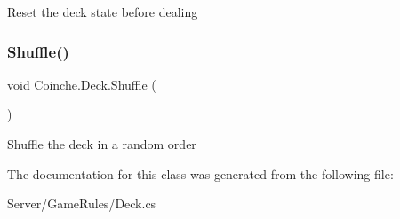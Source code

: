 Reset the deck state before dealing 

\mbox{\label{class_coinche_1_1_deck_a908c7e4a2e22545c903999108b848727}} 
\subsubsection{\texorpdfstring{Shuffle()}{Shuffle()}}
{\footnotesize\ttfamily void Coinche.\+Deck.\+Shuffle (\begin{DoxyParamCaption}{ }\end{DoxyParamCaption})\hspace{0.3cm}{\ttfamily [inline]}}



Shuffle the deck in a random order 



The documentation for this class was generated from the following file\+:\begin{DoxyCompactItemize}
\item 
Server/\+Game\+Rules/Deck.\+cs\end{DoxyCompactItemize}
